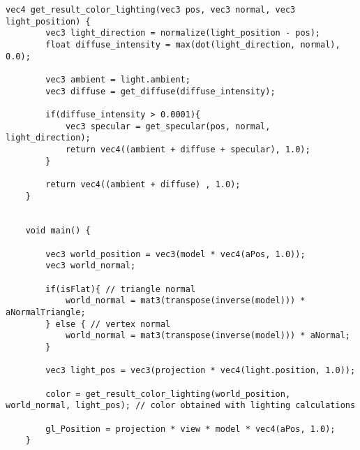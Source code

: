 \begin{lstlisting}[caption={Vertex Shader for vertex/triangle flat shading and triangle Gouraud shading using lighting (Section: \ref{section:extend-flat-shading-lighting})\label{appendix:vs-flat-shading-lighting}}]
    vec4 get_result_color_lighting(vec3 pos, vec3 normal, vec3 light_position) {
        vec3 light_direction = normalize(light_position - pos);
        float diffuse_intensity = max(dot(light_direction, normal), 0.0);

        vec3 ambient = light.ambient;
        vec3 diffuse = get_diffuse(diffuse_intensity);

        if(diffuse_intensity > 0.0001){
            vec3 specular = get_specular(pos, normal, light_direction);
            return vec4((ambient + diffuse + specular), 1.0);
        }

        return vec4((ambient + diffuse) , 1.0);
    }


    void main() {

        vec3 world_position = vec3(model * vec4(aPos, 1.0));
        vec3 world_normal;

        if(isFlat){ // triangle normal
            world_normal = mat3(transpose(inverse(model))) * aNormalTriangle;
        } else { // vertex normal
            world_normal = mat3(transpose(inverse(model))) * aNormal;
        }

        vec3 light_pos = vec3(projection * vec4(light.position, 1.0));

        color = get_result_color_lighting(world_position, world_normal, light_pos); // color obtained with lighting calculations

        gl_Position = projection * view * model * vec4(aPos, 1.0);
    }


\end{lstlisting}

\vspace{10pt}

